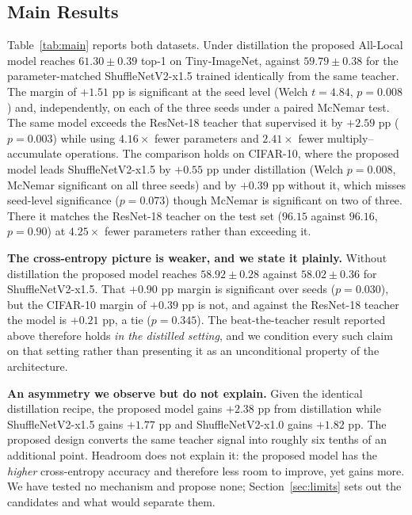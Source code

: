 \subsection{Main Results}
\label{sec:main}

Table~\ref{tab:main} reports both datasets. Under distillation the proposed
All-Local model reaches $61.30 \pm 0.39$ top-1 on Tiny-ImageNet, against $59.79 \pm 0.38$ for
the parameter-matched ShuffleNetV2-x1.5 \cite{shufflenetv2} trained
identically from the same teacher. The margin of $+1.51$ pp is significant at
the seed level (Welch $t = 4.84$, $p = 0.008$) and, independently, on each of
the three seeds under a paired McNemar test. The same model exceeds the
ResNet-18 teacher that supervised it by $+2.59$ pp ($p = 0.003$) while using
$4.16\times$ fewer parameters and $2.41\times$ fewer multiply--accumulate
operations. The comparison holds on CIFAR-10, where
the proposed model leads ShuffleNetV2-x1.5 by $+0.55$ pp under distillation
(Welch $p = 0.008$, McNemar significant on all three seeds) and by $+0.39$ pp
without it, which misses seed-level significance ($p = 0.073$) though McNemar
is significant on two of three. There it matches the ResNet-18 teacher on
the test set ($96.15$ against $96.16$, $p = 0.90$) at $4.25\times$ fewer
parameters rather than exceeding it.

\textbf{The cross-entropy picture is weaker, and we state it plainly.}
Without distillation the proposed model reaches $58.92 \pm 0.28$ against
$58.02 \pm 0.36$ for ShuffleNetV2-x1.5. That $+0.90$ pp margin is significant
over seeds ($p = 0.030$), but the CIFAR-10 margin of $+0.39$ pp is not, and
against the ResNet-18 teacher the model is $+0.21$ pp, a tie ($p = 0.345$). The
beat-the-teacher result reported above therefore holds \emph{in the distilled
setting}, and we condition every such claim on that setting rather than
presenting it as an unconditional property of the architecture.

\textbf{An asymmetry we observe but do not explain.} Given the identical
distillation recipe, the proposed model gains $+2.38$ pp from distillation
while ShuffleNetV2-x1.5 gains $+1.77$ pp and ShuffleNetV2-x1.0 gains $+1.82$
pp. The proposed design converts the same teacher signal into roughly six
tenths of an additional point. Headroom does not explain it: the proposed
model has the \emph{higher} cross-entropy accuracy and therefore less room to
improve, yet gains more. We have tested no mechanism and propose none;
Section~\ref{sec:limits} sets out the candidates and what would separate
them.

